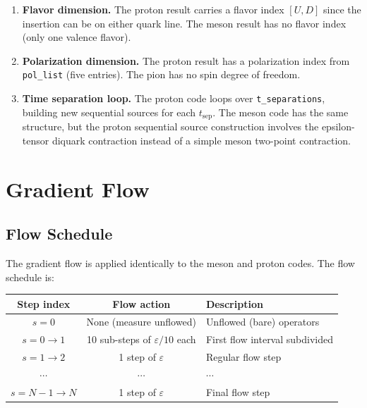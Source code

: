 \documentclass[11pt,a4paper]{article}
\begin{document}
\begin{enumerate}
  \item \textbf{Flavor dimension.}  The proton result carries a flavor index
        $[U, D]$ since the insertion can be on either quark line.  The meson
        result has no flavor index (only one valence flavor).

  \item \textbf{Polarization dimension.}  The proton result has a polarization
        index from \texttt{pol\_list} (five entries).  The pion has no spin
        degree of freedom.

  \item \textbf{Time separation loop.}  The proton code loops over
        \texttt{t\_separations}, building new sequential sources for each
        $t_{\text{sep}}$.  The meson code has the same structure, but the proton
        sequential source construction involves the epsilon-tensor diquark
        contraction instead of a simple meson two-point contraction.
\end{enumerate}

\section{Gradient Flow}

\subsection{Flow Schedule}

The gradient flow is applied identically to the meson and proton codes.  The flow
schedule is:

\begin{center}
\begin{tabular}{ccl}
\toprule
Step index & Flow action & Description \\
\midrule
$s = 0$ & None (measure unflowed) & Unflowed (bare) operators \\
$s = 0 \to 1$ & 10 sub-steps of $\varepsilon/10$ each & First flow interval subdivided \\
$s = 1 \to 2$ & 1 step of $\varepsilon$ & Regular flow step \\
$\cdots$ & $\cdots$ & $\cdots$ \\
$s = N-1 \to N$ & 1 step of $\varepsilon$ & Final flow step \\
\bottomrule
\end{tabular}
\end{center}
\end{document}
